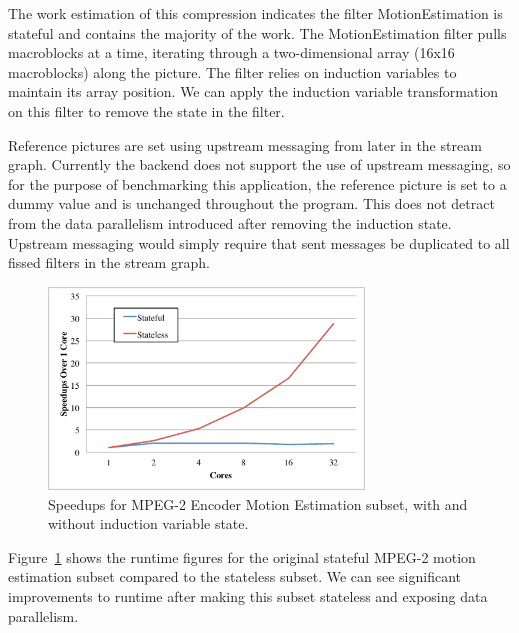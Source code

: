 The work estimation of this compression indicates the filter MotionEstimation is stateful and contains the majority of the work.  The MotionEstimation filter pulls macroblocks at a time, iterating through a two-dimensional array (16x16 macroblocks) along the picture.  The filter relies on induction variables to maintain its array position.  We can apply the induction variable transformation on this filter to remove the state in the filter.

Reference pictures are set using upstream messaging from later in the stream graph.  Currently the backend does not support the use of upstream messaging, so for the purpose of benchmarking this application, the reference picture is set to a dummy value and is unchanged throughout the program.  This does not detract from the data parallelism introduced after removing the induction state.  Upstream messaging would simply require that sent messages be duplicated to all fissed filters in the stream graph.

\begin{figure}[t]
\includegraphics[width=3.3in]{figures/mpeg-results.pdf}
\caption{Speedups for MPEG-2 Encoder Motion Estimation subset, with and without induction variable state.  \protect\label{fig:mpeg-results}}
\end{figure}

Figure~\ref{fig:mpeg-results} shows the runtime figures for the original stateful MPEG-2 motion estimation subset compared to the stateless subset.  We can see significant improvements to runtime after making this subset stateless and exposing data parallelism.